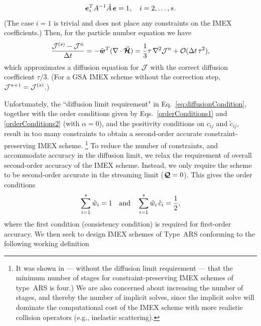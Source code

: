 \begin{equation}
  \boldsymbol{e}_{i}^{T}A^{-1}\tilde{A}\,\boldsymbol{e} = 1, \quad i=2,\ldots,s.
  \label{eq:diffusionCondition}
\end{equation}
(The case $i=1$ is trivial and does not place any constraints on the IMEX coefficients.)  
Then, for the particle number equation we have
\begin{equation}
  \frac{\mathcal{J}^{(s)}-\mathcal{J}^{n}}{\Delta t}
  =-\tilde{\boldsymbol{w}}^{T}(\nabla\cdot\vec{\boldsymbol{\mathcal{H}}})
  =\frac{1}{3}\tau\,\nabla^{2}\mathcal{J}^{n}+\mathcal{O}(\Delta t\,\tau^{2}), 
\end{equation}
which approximates a diffusion equation for $\mathcal{J}$ with the correct diffusion coefficient $\tau/3$.  
(For a GSA IMEX scheme without the correction step, $\mathcal{J}^{n+1}=\mathcal{J}^{(s)}$.)  

Unfortunately, the ``diffusion limit requirement" in Eq.~\eqref{eq:diffusionCondition}, together with the order conditions given by Eqs.~\eqref{orderConditions1} and \eqref{orderConditions2} (with $\alpha=0$), and the positivity conditions on $c_{ij}$ and $\tilde{c}_{ij}$, result in too many constraints to obtain a second-order accurate constraint-preserving IMEX scheme.
\footnote{It was shown in \cite{hu_etal_2018} --- without the diffusion limit requirement --- that the minimum number of stages for constraint-preserving IMEX schemes of type~ARS is four.)  
We are also concerned about increasing the number of stages, and thereby the number of implicit solves, since the implicit solve will dominate the computational cost of the IMEX scheme with more realistic collision operators (e.g., inelastic scattering).}  
To reduce the number of constraints, and accommodate accuracy in the diffusion limit, we relax the requirement of overall second-order accuracy of the IMEX scheme.  
Instead, we only require the scheme to be second-order accurate in the streaming limit ($\boldsymbol{\mathcal{Q}}=0$).  
This gives the order conditions
\begin{equation}
  \sum_{i=1}^{s}\tilde{w}_{i}=1
  \quad\text{and}\quad
  \sum_{i=1}^{s}\tilde{w}_{i}\,\tilde{c}_{i}=\frac{1}{2},
  \label{eq:orderConditionsEx}
\end{equation}
where the first condition (consistency condition) is required for first-order accuracy.  
We then seek to design IMEX schemes of Type~ARS conforming to the following working definition

